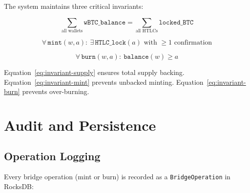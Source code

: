 \documentclass[11pt,a4paper]{article}
\begin{document}
The system maintains three critical invariants:

\begin{equation}
    \sum_{\text{all wallets}} \texttt{wBTC\_balance} = \sum_{\text{all HTLCs}} \texttt{locked\_BTC}
    \label{eq:invariant-supply}
\end{equation}

\begin{equation}
    \forall\, \texttt{mint}(w, a):\ \exists\, \texttt{HTLC\_lock}(a) \text{ with } \geq 1 \text{ confirmation}
    \label{eq:invariant-mint}
\end{equation}

\begin{equation}
    \forall\, \texttt{burn}(w, a):\ \texttt{balance}(w) \geq a
    \label{eq:invariant-burn}
\end{equation}

Equation~\ref{eq:invariant-supply} ensures total supply backing. Equation~\ref{eq:invariant-mint} prevents unbacked minting. Equation~\ref{eq:invariant-burn} prevents over-burning.

\section{Audit and Persistence}
\label{sec:audit}

\subsection{Operation Logging}

Every bridge operation (mint or burn) is recorded as a \texttt{BridgeOperation} in RocksDB:
\end{document}
